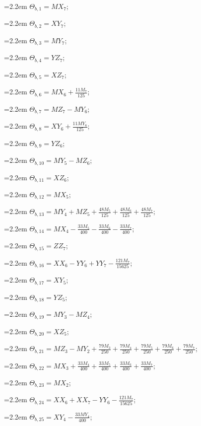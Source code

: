 {\small\setlength{\parindent}{0pt}\raggedright
\hangindent=2.2em $\Theta_{b,1}=MX_{7}$;\par
\hangindent=2.2em $\Theta_{b,2}=XY_{7}$;\par
\hangindent=2.2em $\Theta_{b,3}=MY_{7}$;\par
\hangindent=2.2em $\Theta_{b,4}=YZ_{7}$;\par
\hangindent=2.2em $\Theta_{b,5}=XZ_{7}$;\par
\hangindent=2.2em $\Theta_{b,6}=MX_{6}+\tfrac{11M_{7}}{125}$;\par
\hangindent=2.2em $\Theta_{b,7}=MZ_{7}-MY_{6}$;\par
\hangindent=2.2em $\Theta_{b,8}=XY_{6}+\tfrac{11MY_{6}}{125}$;\par
\hangindent=2.2em $\Theta_{b,9}=YZ_{6}$;\par
\hangindent=2.2em $\Theta_{b,10}=MY_{5}-MZ_{6}$;\par
\hangindent=2.2em $\Theta_{b,11}=XZ_{6}$;\par
\hangindent=2.2em $\Theta_{b,12}=MX_{5}$;\par
\hangindent=2.2em $\Theta_{b,13}=MY_{4}+MZ_{5}+\tfrac{48M_{5}}{125}+\tfrac{48M_{6}}{125}+\tfrac{48M_{7}}{125}$;\par
\hangindent=2.2em $\Theta_{b,14}=MX_{4}-\tfrac{33M_{5}}{400}-\tfrac{33M_{6}}{400}-\tfrac{33M_{7}}{400}$;\par
\hangindent=2.2em $\Theta_{b,15}=ZZ_{7}$;\par
\hangindent=2.2em $\Theta_{b,16}=XX_{6}-YY_{6}+YY_{7}-\tfrac{121M_{7}}{15625}$;\par
\hangindent=2.2em $\Theta_{b,17}=XY_{5}$;\par
\hangindent=2.2em $\Theta_{b,18}=YZ_{5}$;\par
\hangindent=2.2em $\Theta_{b,19}=MY_{3}-MZ_{4}$;\par
\hangindent=2.2em $\Theta_{b,20}=XZ_{5}$;\par
\hangindent=2.2em $\Theta_{b,21}=MZ_{3}-MY_{2}+\tfrac{79M_{3}}{250}+\tfrac{79M_{4}}{250}+\tfrac{79M_{5}}{250}+\tfrac{79M_{6}}{250}+\tfrac{79M_{7}}{250}$;\par
\hangindent=2.2em $\Theta_{b,22}=MX_{3}+\tfrac{33M_{4}}{400}+\tfrac{33M_{5}}{400}+\tfrac{33M_{6}}{400}+\tfrac{33M_{7}}{400}$;\par
\hangindent=2.2em $\Theta_{b,23}=MX_{2}$;\par
\hangindent=2.2em $\Theta_{b,24}=XX_{6}+XX_{7}-YY_{6}-\tfrac{121M_{7}}{15625}$;\par
\hangindent=2.2em $\Theta_{b,25}=XY_{4}-\tfrac{33MY_{4}}{400}$;\par
}

